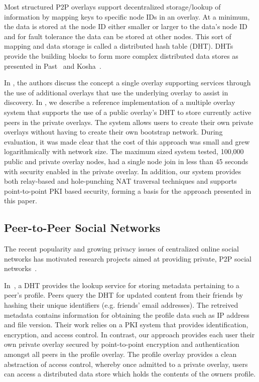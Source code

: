\documentclass[letterpaper,twocolumn,10pt]{article}
\begin{document}
Most structured P2P overlays support decentralized storage/lookup of information by
mapping keys to specific node IDs in an overlay.  At a minimum, the data is stored
at the node ID either smaller or larger to the data's node ID and for fault
tolerance the data can be stored at other nodes.  This sort of mapping
and data storage is called a distributed hash table (DHT).  DHTs provide the
building blocks to form more complex distributed data stores as presented in
Past~\cite{past} and Kosha~\cite{kosha}.

In \cite{one_ring, can_multicast}, the authors discuss the concept a
single overlay supporting services through the use of additional overlays
that use the underlying overlay to assist in discovery.  In \cite{icdcs10}, we
describe a reference implementation of a multiple overlay system that supports
the use of a public overlay's DHT to store currently active peers in the private
overlays. The system allows users to create their own private overlays without
having to create their own bootstrap network.  During evaluation, it was made
clear that the cost of this approach was small and grew logarithmically with
network size.  The maximum sized system tested, 100,000 public and private
overlay nodes, had a single node join in less than 45 seconds with security
enabled in the private overlay.  In addition, our system provides both relay-based
and hole-punching NAT traversal techniques and supports point-to-point PKI
based security, forming a basis for the approach presented in this paper.

\subsection{Peer-to-Peer Social Networks}
The recent popularity and growing privacy issues of centralized online social
networks has motivated research projects aimed at providing private, P2P social
networks~\cite{peerson, matryoshka, tribler-osn, vis-a-vis}.

In~\cite{peerson}, a DHT provides the lookup service for storing metadata
pertaining to a peer's profile. Peers query the DHT for updated content from 
their friends by hashing their unique identifiers (e.g. friends' email
addresses).  The retreived metadata contains information for obtaining the
profile data such as IP address and file version. Their work relies
on a PKI system that provides identification, encryption, and access control.
In contrast, our approach provides each user their own private overlay secured
by point-to-point encryption and authentication amongst all peers in the profile
overlay.  The profile overlay provides a clean abstraction of access control,
whereby once admitted to a private overlay, users can access a distributed data
store which holds the contents of the owners profile.
\end{document}
